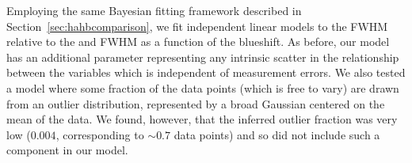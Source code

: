 Employing the same Bayesian fitting framework described in Section~\ref{sec:hahbcomparison}, we fit independent linear models to the  FWHM relative to the \ha and \hb FWHM as a function of the  blueshift. 
As before, our model has an additional parameter representing any intrinsic scatter in the relationship between the variables which is independent of measurement errors.  
We also tested a model where some fraction of the data points (which is free to vary) are drawn from an outlier distribution, represented by a broad Gaussian centered on the mean of the data. 
We found, however, that the inferred outlier fraction was very low ($0.004$, corresponding to $\sim0.7$ data points) and so did not include such a component in our model. 

\begin{figure}
    \captionsetup[subfigure]{labelformat=empty} 
    \centering
    \subfloat[\label{fig:correction_ha_a}]{}
    \subfloat[\label{fig:correction_ha_b}]{}

\end{figure}
